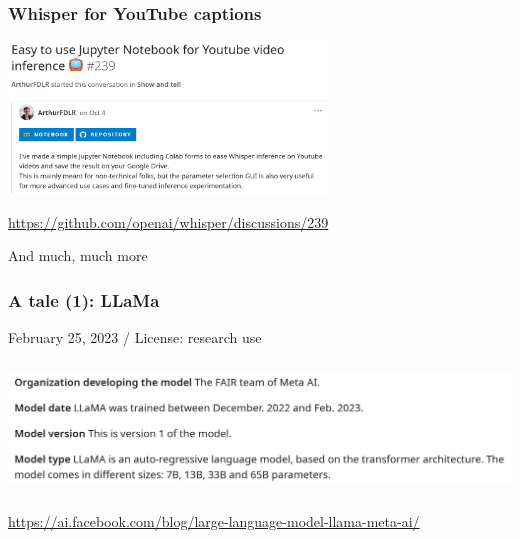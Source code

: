 \documentclass[17pt,aspectratio=169,hyperref={pdfusetitle,colorlinks,allcolors=olive}]{beamer}
\begin{document}
\begin{frame}[fragile]
  \frametitle{Whisper for YouTube captions}

  \includegraphics[width=8.5cm]{figs/whisper-youtube}

  \begin{flushright}
    {\scriptsize
    \url{https://github.com/openai/whisper/discussions/239}
  }
  \end{flushright}

\end{frame}


\begin{frame}[fragile]

  \begin{center}
    {\Large And much, much more}
  \end{center}
    
\end{frame}



\begin{frame}[fragile]
  \frametitle{A tale (1): LLaMa}

  February 25, 2023 / License: research use

  \includegraphics[height=3.5cm]{figs/llama}
  
  \begin{flushright}
    {\scriptsize
      \url{https://ai.facebook.com/blog/large-language-model-llama-meta-ai/}
    }
  \end{flushright}

\end{frame}
\end{document}
